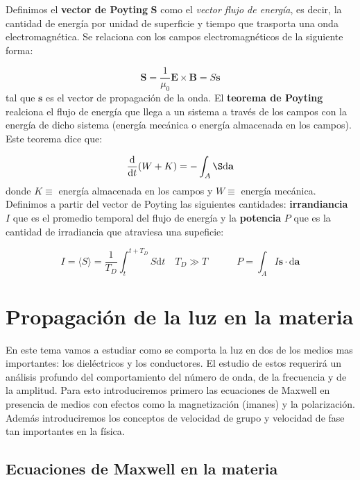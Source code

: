 \documentclass[12pt,a4paper]{article}
\newcommand{\D}{\mathrm{d}}
\newcommand{\tquad}{\quad \quad \quad}
\newcommand{\Bn}{\mathbf{B}}
\newcommand{\En}{\mathbf{E}}
\newcommand{\an}{\mathbf{a}}
\newcommand{\Sn}{\mathbf{S}}
\newcommand{\sn}{\mathbf{s}}
\numberwithin{equation}{section}
\numberwithin{figure}{section}
\begin{document}
Definimos el \textbf{vector de Poyting} $\Sn$ como el \textit{vector flujo de energía}, es decir, la cantidad de energía por unidad de superficie y tiempo que trasporta una onda electromagnética. Se relaciona con los campos electromagnéticos de la siguiente forma:

\begin{equation}
\Sn =  \dfrac{1}{\mu_0} \En \times \Bn = S \sn
\end{equation}
tal que $\sn$ es el vector de propagación de la onda. El \textbf{teorema de Poyting} realciona el flujo de energía que llega a un sistema a través de los campos con la energía de dicho sistema (energía mecánica o energía almacenada en los campos). Este teorema dice que:

\begin{equation}
\dfrac{\D}{\D t} (W+K) = - \int_A \S \D \an
\end{equation}
donde $K \equiv$ energía almacenada en los campos y $W \equiv $ energía mecánica. Definimos a partir del vector de Poyting las siguientes cantidades: \textbf{irrandiancia} $I$ que es el promedio temporal del flujo de energía y la \textbf{potencia} $P$ que es la cantidad de irradiancia que atraviesa una supeficie:

\begin{equation}
I = \langle S \rangle = \dfrac{1}{T_D} \int_t^{t+T_D} S \D t \quad T_D \gg T \tquad P = \int_A I \sn \cdot \D \an 
\end{equation}





\newpage

\section{Propagación de la luz en la materia}

En este tema vamos a estudiar como se comporta la luz en dos de los medios mas importantes: los dieléctricos y los conductores. El estudio de estos requerirá un análisis profundo del comportamiento del número de onda, de la frecuencia y de la amplitud. Para esto introduciremos primero las ecuaciones de Maxwell en presencia de medios con efectos como la magnetización (imanes) y la polarización. Además introduciremos los conceptos de velocidad de grupo y velocidad de fase tan importantes en la física. 

\subsection{Ecuaciones de Maxwell en la materia}
\end{document}
